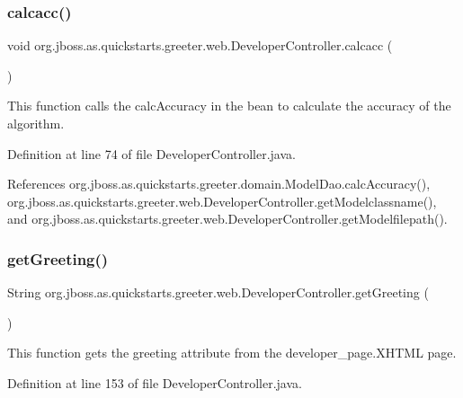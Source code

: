 \subsubsection{\texorpdfstring{calcacc()}{calcacc()}}
{\footnotesize\ttfamily void org.\+jboss.\+as.\+quickstarts.\+greeter.\+web.\+Developer\+Controller.\+calcacc (\begin{DoxyParamCaption}{ }\end{DoxyParamCaption})}



This function calls the calc\+Accuracy in the bean to calculate the accuracy of the algorithm. 



Definition at line 74 of file Developer\+Controller.\+java.



References org.\+jboss.\+as.\+quickstarts.\+greeter.\+domain.\+Model\+Dao.\+calc\+Accuracy(), org.\+jboss.\+as.\+quickstarts.\+greeter.\+web.\+Developer\+Controller.\+get\+Modelclassname(), and org.\+jboss.\+as.\+quickstarts.\+greeter.\+web.\+Developer\+Controller.\+get\+Modelfilepath().

\mbox{\label{classorg_1_1jboss_1_1as_1_1quickstarts_1_1greeter_1_1web_1_1_developer_controller_a033fea1a1afc1e2ae958ce0466d62888}} 
\subsubsection{\texorpdfstring{get\+Greeting()}{getGreeting()}}
{\footnotesize\ttfamily String org.\+jboss.\+as.\+quickstarts.\+greeter.\+web.\+Developer\+Controller.\+get\+Greeting (\begin{DoxyParamCaption}{ }\end{DoxyParamCaption})}



This function gets the greeting attribute from the developer\+\_\+page.\+X\+H\+T\+ML page. 



Definition at line 153 of file Developer\+Controller.\+java.



